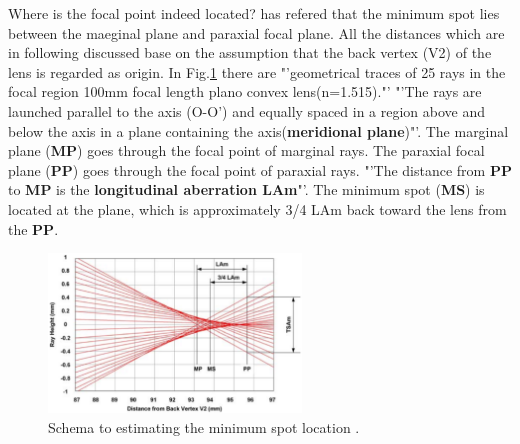 Where is the focal point indeed located? \cite{lens_theory_LC_Ltd} has refered that the minimum spot lies between the maeginal plane and paraxial focal plane. All the distances which are in following discussed base on the assumption that the back vertex (V2) of the lens is regarded as origin. In Fig.\ref{fig:min_max_spot} there are "'geometrical traces of 25 rays in the focal region 100mm focal length plano convex lens(n=1.515)."'  "'The rays are launched parallel to the axis (O-O') and equally spaced in a region above and below the axis in a plane containing the axis(\textbf{meridional plane})"'. The marginal plane (\textbf{MP}) goes through the focal point of marginal rays. The paraxial focal plane (\textbf{PP}) goes through the focal point of paraxial rays. "'The distance from \textbf{PP} to \textbf{MP} is the \textbf{longitudinal aberration LAm}"'. The minimum spot (\textbf{MS}) is located at the plane, which is approximately 3/4 LAm back toward the lens from the \textbf{PP}.
\begin{figure}[httbp]
\centering
\includegraphics[width=0.6\textwidth]{bilder/min_max_spot}
\caption{Schema to estimating the minimum spot location \cite{lens_theory_LC_Ltd}.}
\label{fig:min_max_spot}
\end{figure}
